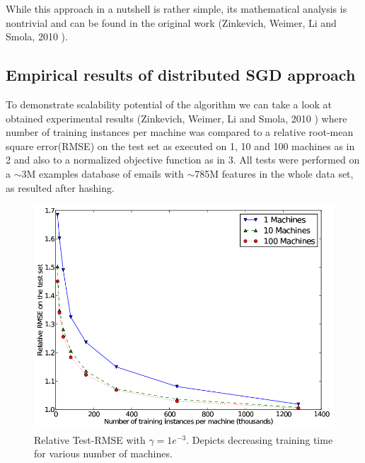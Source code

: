 While this approach in a nutshell is rather simple, its mathematical analysis is nontrivial and can be found in the original work (Zinkevich, Weimer, Li and Smola, 2010 \cite{NIPS2010_4006}).

\subsection{Empirical results of distributed SGD approach}
To demonstrate scalability potential of the algorithm we can take a look at obtained experimental results (Zinkevich, Weimer, Li and Smola, 2010 \cite{NIPS2010_4006}) where number of training instances per machine was compared to a relative root-mean square error(RMSE) on the test set as executed on 1, 10 and 100 machines as in \figurename{2} and also to a normalized objective function as in \figurename{3}. All tests were performed on a $\sim$3M examples database of emails with $\sim$785M features in the whole data set, as resulted after hashing.

\begin{figure}[h]
	\begin{center}
		\includegraphics[scale=0.3]{img/parallel-sgd-experiment.png}
		\caption{Relative Test-RMSE with $\gamma= 1e^{-3}$. Depicts decreasing training time for various number of machines.}\label{2}
	\end{center}
\end{figure}

